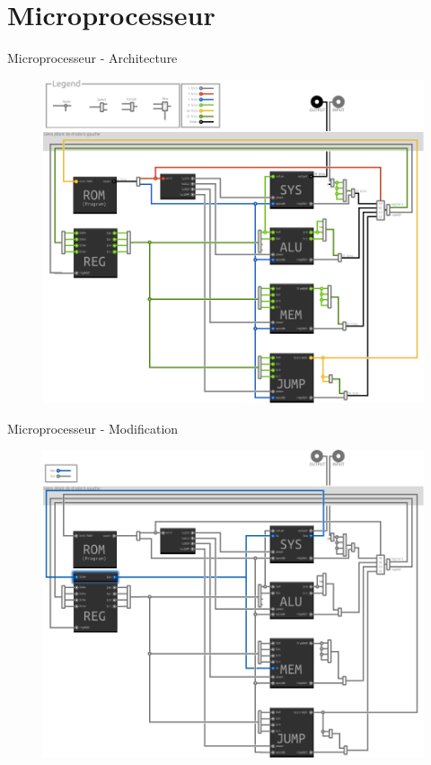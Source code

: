 \documentclass[handout]{beamer}
\begin{document}
\section{Microprocesseur}
\begin{frame}{Microprocesseur - Architecture}
	\begin{figure}
		\centering
		\includegraphics[width=\textwidth,height=0.9\textheight,keepaspectratio]{archi}
	\end{figure}
\end{frame}

\begin{frame}{Microprocesseur - Modification}
	\begin{figure}
		\centering
		\includegraphics[width=\textwidth,height=0.9\textheight,keepaspectratio]{archi_update}
	\end{figure}
\end{frame}
\end{document}
